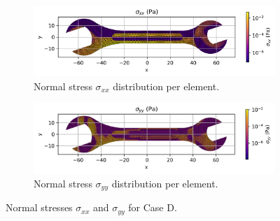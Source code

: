\begin{figure}[H]
    \centering
    \begin{subfigure}[t]{0.49\textwidth}
        \centering
        \includegraphics[width=\textwidth]{GRAFICOS/Case d - sigma_xx_per_element.png}
        \caption{Normal stress $\sigma_{xx}$ distribution per element.}
        \label{fig:sigma_xx_d}
    \end{subfigure}
    \hfill
    \begin{subfigure}[t]{0.49\textwidth}
        \centering
        \includegraphics[width=\textwidth]{GRAFICOS/Case d - sigma_yy_per_element.png}
        \caption{Normal stress $\sigma_{yy}$ distribution per element.}
        \label{fig:sigma_yy_d}
    \end{subfigure}
    \caption{Normal stresses $\sigma_{xx}$ and $\sigma_{yy}$ for Case D.}
    \label{fig:normal_stresses_d}
\end{figure}


